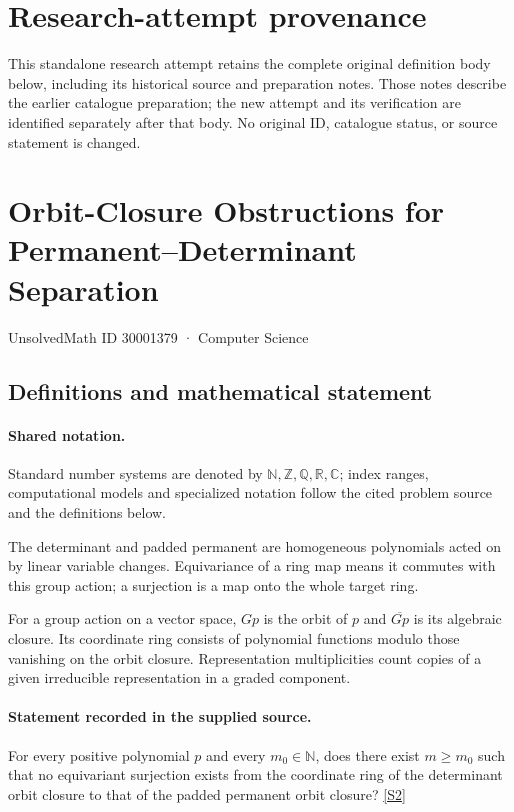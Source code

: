\documentclass[11pt]{article}
\begin{document}
\section*{Research-attempt provenance}
This standalone research attempt retains the complete original definition body below,
including its historical source and preparation notes. Those notes describe the
earlier catalogue preparation; the new attempt and its verification are identified
separately after that body. No original ID, catalogue status, or source statement is changed.

\section{Orbit-Closure Obstructions for Permanent–Determinant Separation}\label{30001379}
{\small UnsolvedMath ID 30001379 · Computer Science}
\subsection{Definitions and mathematical statement}

\paragraph{Shared notation.}Standard number systems are denoted by $\mathbb N,\mathbb Z,\mathbb Q,\mathbb R,\mathbb C$; index ranges, computational models and specialized notation follow the cited problem source and the definitions below.


The determinant and padded permanent are homogeneous polynomials acted on by linear variable changes. Equivariance of a ring map means it commutes with this group action; a surjection is a map onto the whole target ring.

For a group action on a vector space, $Gp$ is the orbit of $p$ and $\overline{Gp}$ is its algebraic closure. Its coordinate ring consists of polynomial functions modulo those vanishing on the orbit closure. Representation multiplicities count copies of a given irreducible representation in a graded component.
\paragraph{Statement recorded in the supplied source.}
For every positive polynomial $p$ and every $m_0\in\mathbb{N}$, does there exist $m\geq m_0$ such that no equivariant surjection exists from the coordinate ring of the determinant orbit closure to that of the padded permanent orbit closure? \href{https://doi.org/10.4171/owr/2009/52}{[S2]}
\end{document}
